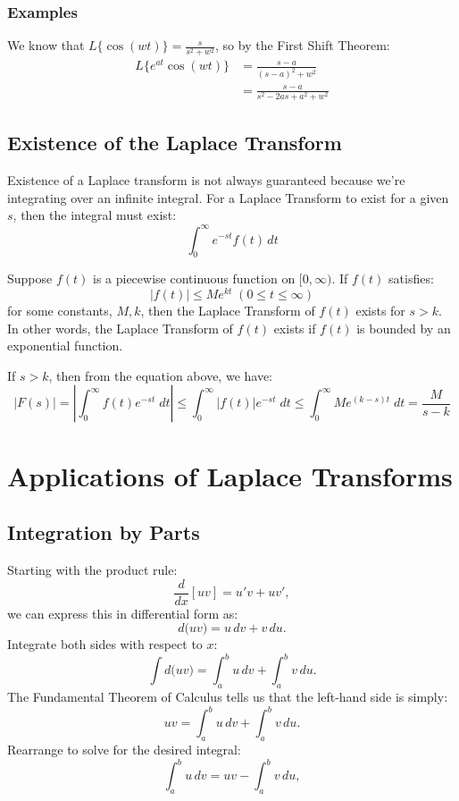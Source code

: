 \documentclass[a4paper, 10pt]{article}
\begin{document}
\subsubsection{Examples}
\begin{examplebox}
  We know that $L\{\cos(wt)\} = \frac{s}{s^2 + w^2}$, so by the First Shift Theorem:
  \begin{align*}
    L\{e^{at}\cos(wt)\} & = \frac{s-a}{(s-a)^2 + w^2}         \\
                        & = \frac{s-a}{s^2 - 2as + a^2 + w^2}
  \end{align*}
\end{examplebox}
\subsection{Existence of the Laplace Transform}
Existence of a Laplace transform is not always guaranteed because we're integrating over an infinite integral. For a Laplace Transform to exist for a given $s$, then the integral must exist:
$$\int_0^\infty e^{-st}f(t)\, dt$$

\begin{theorembox}
  Suppose $f(t)$ is a piecewise continuous function on $[0,\infty)$. If $f(t)$ satisfies:
  $$|f(t)| \leq Me^{kt} \; (0 \leq t \leq \infty)$$
  for some constants, $M, k$, then the Laplace Transform of $f(t)$ exists for $s > k$. In other words, the Laplace Transform of $f(t)$ exists if $f(t)$ is bounded by an exponential function.
\end{theorembox}

\begin{proofbox}
  If $s > k$, then from the equation above, we have:
  $$|F(s)| = \left | \int_0^\infty f(t)e^{-st} \; dt  \right | \leq \int_{0}^{\infty} |f(t)| e^{-st} \; dt \leq \int_{0}^\infty Me^{(k-s)t} \; dt = \frac{M}{s-k}$$
\end{proofbox}

\section{Applications of Laplace Transforms}
\subsection{Integration by Parts}
Starting with the product rule:
$$
  \frac{d}{dx}[uv] = u'v + uv',
$$
we can express this in differential form as:
$$
  d\bigl(uv\bigr) = u\,dv + v\,du.
$$
Integrate both sides with respect to \(x\):
$$
  \int d\bigl(uv\bigr) = \int_a^b u\,dv + \int_a^b v\,du.
$$
The Fundamental Theorem of Calculus tells us that the left-hand side is simply:
$$
  uv = \int_a^b u\,dv + \int_a^b v\,du.
$$
Rearrange to solve for the desired integral:
$$
  \int_a^b u\,dv = uv - \int_a^b v\,du,
$$
\end{document}
